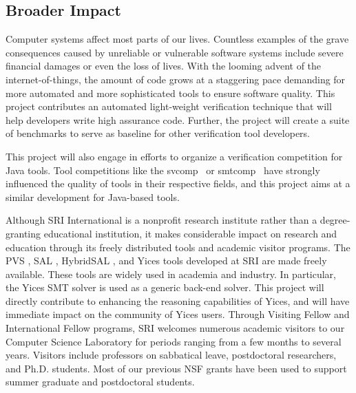 \subsection{Broader Impact}
Computer systems affect most parts of our lives. 
Countless examples of the grave consequences 
caused by unreliable or vulnerable software systems
include  severe financial 
damages or even the loss of lives. With the looming advent of 
the internet-of-things, the amount of code  grows at a staggering pace 
demanding for more automated and more sophisticated tools to ensure
software quality.
This project contributes an automated light-weight verification technique that
will help developers write high assurance code.
Further, the project will create a suite of benchmarks to serve as 
baseline for other verification tool developers.  

This project will also engage in efforts to organize a verification competition 
for Java tools. Tool competitions like the \textsf{svcomp}~\cite{svcomp} 
or \textsf{smtcomp}~\cite{smtcomp} have strongly influenced the quality of 
tools in their respective fields, and this project aims at a similar development for Java-based tools.

Although SRI International is a nonprofit research institute rather than a degree-granting educational institution, it makes considerable impact on research and education through its freely distributed tools and  academic visitor programs. The PVS \cite{owre1992pvs}, SAL \cite{bensalem2000overview}, HybridSAL \cite{tiwari2012hybridsal}, and Yices \cite{dutertre2014yices} tools developed at SRI are made freely available. These tools are widely used in academia and industry. In particular, the Yices SMT solver is used as a generic back-end solver. This project will directly contribute to enhancing the reasoning capabilities of Yices, and will have immediate impact on the community of Yices users. Through Visiting Fellow and International Fellow programs, SRI welcomes numerous academic visitors to our Computer Science Laboratory for periods ranging from a few months to several years.  Visitors include professors on sabbatical leave, postdoctoral researchers, and Ph.D. students.  Most of our previous NSF grants have been used to support summer graduate  and postdoctoral students.